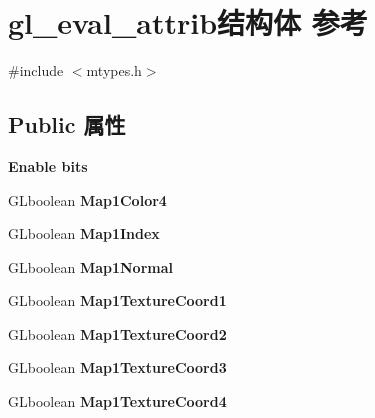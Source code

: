 \hypertarget{structgl__eval__attrib}{}\section{gl\+\_\+eval\+\_\+attrib结构体 参考}
\label{structgl__eval__attrib}


{\ttfamily \#include $<$mtypes.\+h$>$}

\subsection*{Public 属性}
\begin{Indent}\textbf{ Enable bits}\par
\begin{DoxyCompactItemize}
\item 
\mbox{\label{structgl__eval__attrib_a13f060fb690f5e79c07dd3597f8c729a}} 
G\+Lboolean {\bfseries Map1\+Color4}
\item 
\mbox{\label{structgl__eval__attrib_ad99822b1baae9c33a2b5473a771b5a5f}} 
G\+Lboolean {\bfseries Map1\+Index}
\item 
\mbox{\label{structgl__eval__attrib_a374a2c2945dae16a170b6b48667775b8}} 
G\+Lboolean {\bfseries Map1\+Normal}
\item 
\mbox{\label{structgl__eval__attrib_ae90b44bacac9b5a85b0548c86cc539d5}} 
G\+Lboolean {\bfseries Map1\+Texture\+Coord1}
\item 
\mbox{\label{structgl__eval__attrib_ac33a5823254ee6d4364e76b2debc146d}} 
G\+Lboolean {\bfseries Map1\+Texture\+Coord2}
\item 
\mbox{\label{structgl__eval__attrib_abf5c9e1caf9f704b501f78e96e0a5102}} 
G\+Lboolean {\bfseries Map1\+Texture\+Coord3}
\item 
\mbox{\label{structgl__eval__attrib_a1e369fd7799f53bab21cec056a35e701}} 
G\+Lboolean {\bfseries Map1\+Texture\+Coord4}
\item 
\mbox{\label{structgl__eval__attrib_a8a1c7e2027fb062843f2b847ae392cee}} 

\end{DoxyCompactItemize}
\end{Indent}
